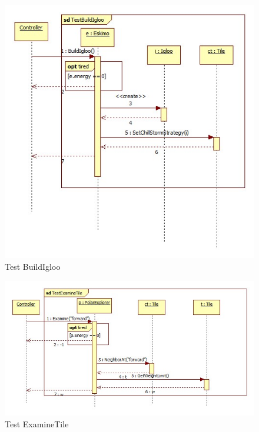 \begin{figure}[h]
	\begin{center}
		\includegraphics[width=17cm]{chapters/chapter05/diagrams/Test_BuildIgloo.jpg}
		\caption{Test BuildIgloo}
		\label{fig:Test BuildIgloo}
	\end{center}
\end{figure}

\begin{figure}[h]
	\begin{center}
		\includegraphics[width=17cm]{chapters/chapter05/diagrams/Test_ExamineTile.jpg}
		\caption{Test ExamineTile}
		\label{fig:Test ExamineTile}
	\end{center}
\end{figure}

